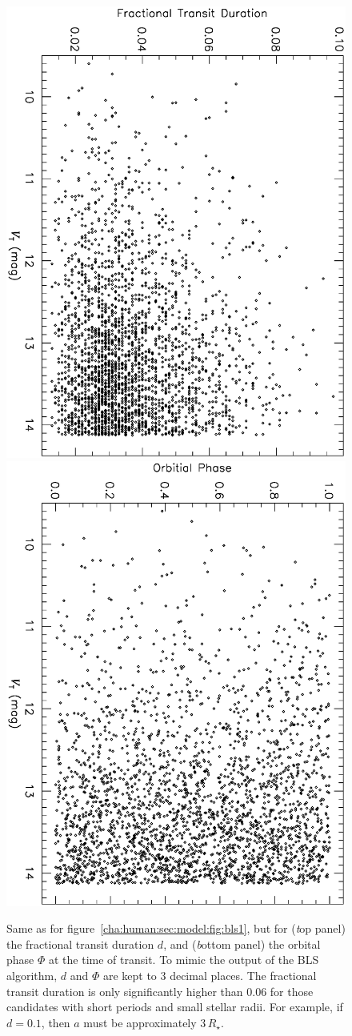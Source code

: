 \begin{figure}
\begin{center}
\centering
\includegraphics[width=.55\textwidth, angle=90]{7_bls_c}\\
\includegraphics[width=.55\textwidth, angle=90]{7_bls_d}\\
\caption[Randomized values for final two BLS parameters]{%
Same as for figure~\ref{cha:human:sec:model:fig:bls1}, but for %
({\textit top panel}) the fractional transit duration $d$, and %
({\textit bottom panel})  the orbital phase $\Phi$ at the time of transit.
To mimic the output of the BLS algorithm, $d$ and $\Phi$ are kept to 3 decimal places.
The fractional transit duration is only significantly higher than $0.06$ for those candidates with short periods and small stellar radii.
For example, if $d=0.1$, then $a$ must be approximately $3\,R_{\star}$. %
%
}\label{cha:human:sec:model:fig:bls2}
\end{center}
\end{figure}

